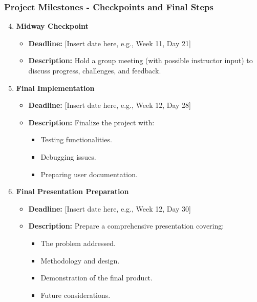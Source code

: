 \documentclass[aspectratio=169]{beamer}
\begin{document}
\begin{frame}[fragile]
    \frametitle{Project Milestones - Checkpoints and Final Steps}
    \begin{enumerate}
        \setcounter{enumi}{3}
        \item \textbf{Midway Checkpoint}
        \begin{itemize}
            \item \textbf{Deadline:} [Insert date here, e.g., Week 11, Day 21]
            \item \textbf{Description:} Hold a group meeting (with possible instructor input) to discuss progress, challenges, and feedback.
        \end{itemize}

        \item \textbf{Final Implementation}
        \begin{itemize}
            \item \textbf{Deadline:} [Insert date here, e.g., Week 12, Day 28]
            \item \textbf{Description:} Finalize the project with:
            \begin{itemize}
                \item Testing functionalities.
                \item Debugging issues.
                \item Preparing user documentation.
            \end{itemize}
        \end{itemize}
        
        \item \textbf{Final Presentation Preparation}
        \begin{itemize}
            \item \textbf{Deadline:} [Insert date here, e.g., Week 12, Day 30]
            \item \textbf{Description:} Prepare a comprehensive presentation covering:
            \begin{itemize}
                \item The problem addressed.
                \item Methodology and design.
                \item Demonstration of the final product.
                \item Future considerations.
            \end{itemize}
        \end{itemize}
    \end{enumerate}
\end{frame}
\end{document}
